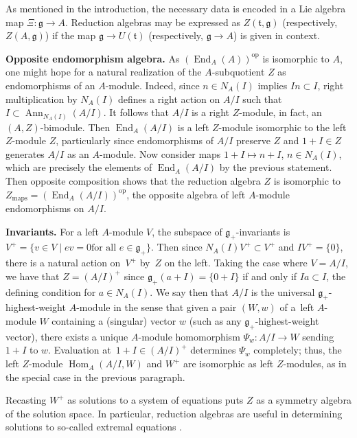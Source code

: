 \documentclass[pdftex]{sigma}
\numberwithin{equation}{section}
\DeclareMathOperator{\Ann}{Ann}
\DeclareMathOperator{\End}{End}
\DeclareMathOperator{\Hom}{Hom}
\begin{document}
\begin{Remark}
	As mentioned in the introduction, the necessary data is encoded in a Lie algebra map $\Xi\colon \mathfrak{g} \rightarrow A$. Reduction algebras may be expressed as $Z(\mathfrak{t},\mathfrak{g})$ (respectively, $Z(A, \mathfrak{g})$) if the map $\mathfrak{g} \rightarrow U(\mathfrak{t})$ (respectively, $\mathfrak{g} \rightarrow A$) is given in context.
\end{Remark}

{\bf Opposite endomorphism algebra.} As $(\End_{A}(A))^{\mathrm{op}}$ is isomorphic to $A$, one might hope for a natural realization of the $A$-sub\-quo\-tient $Z$ as endomorphisms of an $A$-module.
Indeed, since $n \in N_{A}(I)$ implies $In \subset I$, right multiplication by $N_{A}(I)$ defines a right action on $A/I$ such that $I \subset \Ann_{N_{A}(I)}(A/I)$. It follows that $A/I$ is a right $Z$-module, in fact, an $(A,Z)$-bimodule. Then $\End_{A}(A/I)$ is a left $Z$-module isomorphic to the left $Z$-module $Z$, particularly since endomorphisms of $A/I$ preserve $Z$ and $1+I \in Z$ generates $A/I$ as an $A$-module. Now consider maps $1+I \mapsto n+I$, $n \in N_{A}(I)$, which are precisely the elements of $\End_{A}(A/I)$ by the previous statement. Then opposite composition shows that the reduction algebra $Z$ is isomorphic to $Z_{\text{maps}} = (\End_{A}(A/I))^{\mathrm{op}}$, the opposite algebra of left $A$-module endomorphisms on $A/I$.

{\bf Invariants.}
For a left $A$-module $V$, the subspace of $\mathfrak{g}_{+}$-invariants is $V^{+} = \{{v \in V \mid ev = 0} \allowbreak \text{for all } e\in \mathfrak{g}_{+} \}$.
Then since $N_{A}(I)V^{+} \subset V^{+}$ and $IV^{+} = \{0\}$, there is a natural action on~$V^{+}$ by~$Z$ on the left. Taking the case where $V = A/I$, we have that $Z = (A/I)^{+}$ since ${\mathfrak{g}_{+}(a + I) = \{0 + I\}}$ if and only if $Ia \subset I$, the defining condition for $a \in N_{A}(I)$. We say then that $A/I$ is the universal $\mathfrak{g}_{+}$-highest-weight $A$-module in the sense that given a pair $(W,w)$ of a~left $A$-module $W$ containing a (singular) vector $w$ (such as any $\mathfrak{g}_{+}$-highest-weight vector), there exists a unique $A$-module homomorphism $\Psi_{w}\colon A/I \rightarrow W$ sending $1+I$ to $w$. Evaluation at~${1+I \in (A/I)^{+}}$ determines $\Psi_{w}$ completely; thus, the left $Z$-module $\Hom_{A}(A/I,W)$ and $W^{+}$ are isomorphic
as left $Z$-modules, as in the special case in the previous paragraph.

\begin{Remark}
	Recasting $W^{+}$ as solutions to a system of equations puts $Z$ as a symmetry algebra of the solution space. In particular, reduction algebras are useful in determining solutions to so-called extremal equations \cite{zhelobenkoHypersymmetriesExtremalEquations1997}.
\end{Remark}
\end{document}
